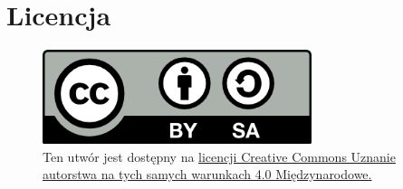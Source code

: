 \section*{Licencja}
    \begin{figure}[h]
    	\begin{minipage}[c]{0.25\textwidth}
    		\includegraphics[width=0.7\textwidth]{img/licencja.png}
    	\end{minipage}\hfill
    	\begin{minipage}[c]{0.75\textwidth}
    		\caption*{
    			Ten utwór jest dostępny na 
    			\href{https://creativecommons.org/licenses/by-sa/4.0/}{licencji Creative Commons Uznanie autorstwa
    			na tych samych warunkach 4.0 Międzynarodowe.}
    		}
    	\end{minipage}
    \end{figure}
